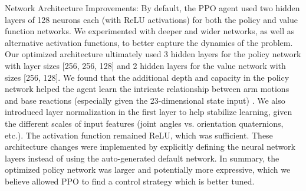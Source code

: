 \documentclass{ieeeaccess}
\begin{document}
Network Architecture Improvements: By default, the PPO agent used two hidden layers of 128
neurons each (with ReLU activations) for both the policy and value function networks. We
experimented with deeper and wider networks, as well as alternative activation functions, to better
capture the dynamics of the problem. Our optimized architecture ultimately used 3 hidden layers for
the policy network with layer sizes [256, 256, 128] and 2 hidden layers for the value network with sizes
[256, 128]. We found that the additional depth and capacity in the policy network helped the agent learn
the intricate relationship between arm motions and base reactions (especially given the 23-dimensional
state input) \cite{b4}. We also introduced layer normalization in the first layer to help stabilize learning,
given the different scales of input features (joint angles vs. orientation quaternions, etc.). The activation
function remained ReLU, which was sufficient. These architecture changes were implemented by
explicitly defining the neural network layers instead of using the auto-generated default network.
In summary, the optimized policy network was larger and potentially more expressive, which we believe
allowed PPO to find a control strategy which is better tuned.
\end{document}
